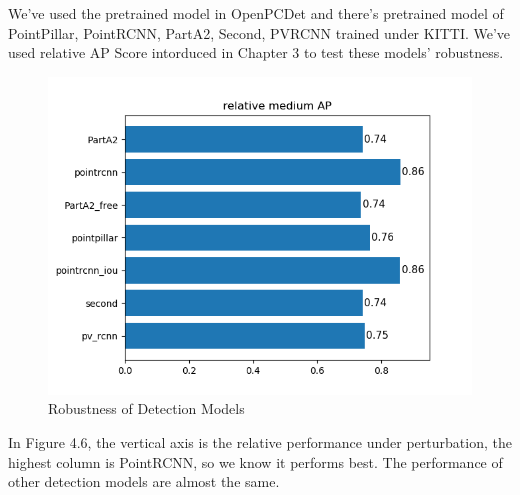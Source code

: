 We've used the pretrained model in OpenPCDet and there's pretrained model of PointPillar\cite{lang_pointpillars_2019}, PointRCNN, PartA2\cite{shi_points_2020}, Second\cite{yan_second_2018}, PVRCNN\cite{shi_pv-rcnn_2021} trained under KITTI. We've used relative AP Score intorduced in Chapter 3 to test these models' robustness.
\begin{figure}[!htbp]
\centering
\includegraphics[scale=0.3]{Graphics/Relative AP.png}
\caption{Robustness of Detection Models}
\label{fig:Relative AP}
\end{figure}

In Figure 4.6, the vertical axis is the relative performance under perturbation, the highest column is PointRCNN, so we know it performs best. The performance of other detection models are 
almost the same.

